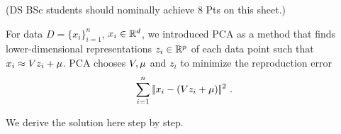 

\renewcommand{\course}{Machine Learning}
\renewcommand{\exnum}{8}

\exercises

(DS BSc students should nominally achieve 8 Pts on this sheet.)



For data $D=\{x_i\}_{i=1}^n$, $x_i\in{\mathbb{R}}^d$, we introduced PCA as a method that finds lower-dimensional representations $z_i\in{\mathbb{R}}^p$ of each data point such that $x_i \approx V z_i + \mu$. PCA chooses $V,\mu$ and $z_i$ to minimize the reproduction error
$$ \sum_{i=1}^n |\!|x_i - (V z_i + \mu)|\!|^2 ~.$$

We derive the solution here step by step.

